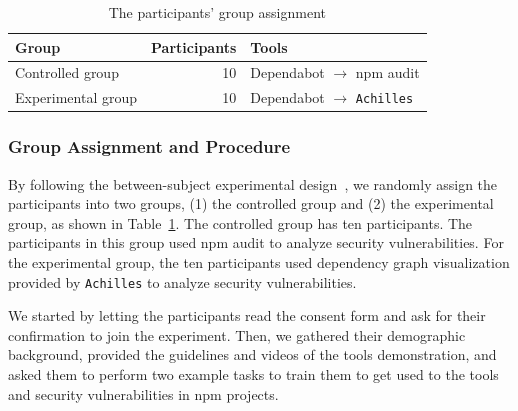 \documentclass[conference]{IEEEtran}
\begin{document}
	\begin{table}[tb]
		\centering
		\caption{The participants' group assignment}
		\begin{tabular}{lrl}
			\toprule
			Group & Participants & Tools \\
			\midrule
			Controlled group & 10 & Dependabot $\rightarrow$ npm audit \\
			\midrule
			Experimental group & 10 & Dependabot $\rightarrow$ \texttt{Achilles} \\
			\bottomrule
		\end{tabular}
		\label{table:group_assignment}
	\end{table}
	
	\subsubsection{Group Assignment and Procedure}
	By following the between-subject experimental design~\citep{Charness2012}, we randomly assign the participants into two groups, (1) the controlled group and (2) the experimental group, as shown in Table~\ref{table:group_assignment}. The controlled group has ten participants. The participants in this group used npm audit to analyze security vulnerabilities. For the experimental group, the ten participants used dependency graph visualization provided by \texttt{Achilles} to analyze security vulnerabilities. 
	
	We started by letting the participants read the consent form and ask for their confirmation to join the experiment. Then, we gathered their demographic background, provided the guidelines and videos of the tools demonstration, and asked them to perform two example tasks to train them to get used to the tools and security vulnerabilities in npm projects.
	
	
	
\end{document}
